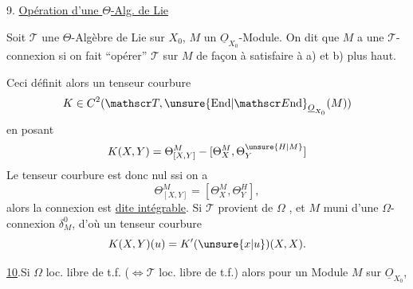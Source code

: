9.\quad {} \uline{Opération d'une $\Theta$-Alg. de Lie}

Soit $\mathscr T$ une $\Theta$-Algèbre de Lie sur $X_0$, $M$ un $\underline O_{X_0}$-Module. On dit que  $M$ a une $\mathscr T$-connexion si on fait ``opérer'' $\mathscr T$ sur $M$ de façon à satisfaire à a) et b) plus haut.

Ceci définit alors un tenseur courbure
\[
K\in C^2(\mathscr T,\unsure{\mathrm{End}|\mathscr E\mathrm{nd}}_{\underline O_{X_0}}(M))
\]
en posant
\[
K(X,Y)=\Theta_{[X,Y]}^M-[\Theta_X^M,\Theta_Y^{\unsure{H|M}}]
\]
Le tenseur courbure est donc nul ssi on a
\[
\Theta_{[X,Y]}^M=[\Theta_X^M,\Theta_Y^H],
\]
alors la connexion est \uline{dite intégrable}. Si $\mathscr T$ provient de $\Omega$ , et $M$  muni d'une $\Omega$-connexion $\delta_M^0$, d'où un tenseur courbure
\[
K(X,Y)(u)=K'(\unsure{x|u})(X,X).
\]

\uline{10}.\quad Si  $\Omega$ loc. libre de t.f. ($\Longleftrightarrow\mathscr T$  loc. libre de t.f.) alors pour un Module $M$ sur $\underline O_{X_0}$,


